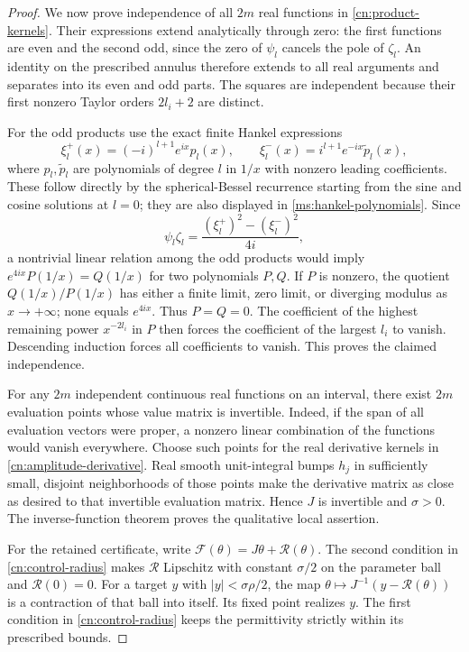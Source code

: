 \begin{proof}
We now prove independence of all $2m$ real functions in
\eqref{cn:product-kernels}.  Their expressions extend analytically
through zero: the first functions are even and the second odd, since
the zero of $\psi_l$ cancels the pole of $\zeta_l$.
An identity on the prescribed annulus therefore extends to all real
arguments and separates into its even and odd parts.
The squares are independent because their first nonzero Taylor
orders $2l_i+2$ are distinct.

For the odd products use the exact finite Hankel expressions
\begin{equation}\label{cn:finite-hankel}
 \xi_l^+(x)=(-i)^{l+1}e^{ix}p_l(x),\qquad
 \xi_l^-(x)=i^{l+1}e^{-ix}\widetilde p_l(x),
\end{equation}
where $p_l,\widetilde p_l$ are polynomials of degree $l$ in $1/x$
with nonzero leading coefficients.  These follow directly by the
spherical-Bessel recurrence starting from the sine and cosine
solutions at $l=0$; they are also displayed in
\eqref{ms:hankel-polynomials}.
Since
\begin{equation}\label{cn:odd-product-hankel}
 \psi_l\zeta_l=
 \frac{(\xi_l^+)^2-(\xi_l^-)^2}{4i},
\end{equation}
a nontrivial linear relation among the odd products would imply
$e^{4ix}P(1/x)=Q(1/x)$ for two polynomials $P,Q$.
If $P$ is nonzero, the quotient $Q(1/x)/P(1/x)$ has either a finite
limit, zero limit, or diverging modulus as $x\to+\infty$; none equals
$e^{4ix}$.  Thus $P=Q=0$.  The coefficient of the highest remaining
power $x^{-2l_i}$ in $P$ then forces the coefficient of the largest
$l_i$ to vanish.  Descending induction forces all coefficients to
vanish.  This proves the claimed independence.

For any $2m$ independent continuous real functions on an interval,
there exist $2m$ evaluation points whose value matrix is invertible.
Indeed, if the span of all evaluation vectors were proper, a nonzero
linear combination of the functions would vanish everywhere.
Choose such points for the real derivative kernels in
\eqref{cn:amplitude-derivative}.  Real smooth unit-integral bumps
$h_j$ in sufficiently small, disjoint neighborhoods of those points
make the derivative matrix as close as desired to that invertible
evaluation matrix.  Hence $J$ is invertible and $\sigma>0$.
The inverse-function theorem proves the qualitative local assertion.

For the retained certificate, write
$\mathcal F(\theta)=J\theta+\mathcal R(\theta)$.
The second condition in \eqref{cn:control-radius} makes
$\mathcal R$ Lipschitz with constant $\sigma/2$ on the parameter
ball and $\mathcal R(0)=0$.  For a target $y$ with
$|y|<\sigma\rho/2$, the map
$\theta\mapsto J^{-1}(y-\mathcal R(\theta))$
is a contraction of that ball into itself.  Its fixed point realizes
$y$.  The first condition in \eqref{cn:control-radius} keeps the
permittivity strictly within its prescribed bounds.


\end{proof}
